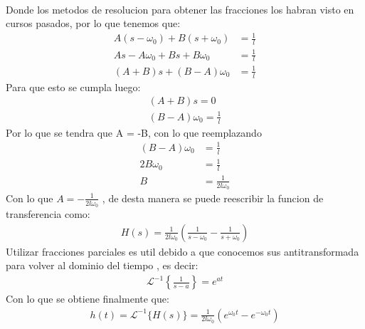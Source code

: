\documentclass[
  11pt,
  letterpaper,
   addpoints,
   answers
  ]{exam}
\begin{document}
\begin{questions}
\begin{solution}
\begin{align}
        \end{align}
        Donde los metodos de resolucion para obtener las fracciones los habran visto en cursos pasados, por lo que tenemos que:
        \begin{align}
            A(s-\omega_{0}) + B(s+\omega_{0}) &= \frac{1}{l}\\
            As - A\omega_{0} + Bs + B\omega_{0} &= \frac{1}{l}\\
            (A+B)s + (B-A)\omega_{0} &= \frac{1}{l}
        \end{align}
        Para que esto se cumpla luego:
        \begin{align}
            (A+B)s=0\\
            (B-A)\omega_{0} = \frac{1}{l}
        \end{align}
    Por lo que se tendra que A = -B, con lo que reemplazando
    \begin{align}
        (B-A)\omega_{0} &= \frac{1}{l}\\
        2B\omega_{0} &= \frac{1}{l}\\
        B &= \frac{1}{2l\omega_{0}}
    \end{align}
    Con lo que $A=-\frac{1}{2l\omega_{0}}$ , de desta manera se puede reescribir la funcion de transferencia como:
    \begin{align}
        H(s) = \frac{1}{2l\omega_{0}}\left(\frac{1}{s-\omega_{0}} - \frac{1}{s+\omega_{0}}\right)
    \end{align}
    Utilizar fracciones parciales es util debido a que conocemos sus antitransformada para volver al dominio del tiempo , es decir:
    \begin{align}
        \mathcal{L}^{-1}\left\{\frac{1}{s-a}\right\} = e^{at}
    \end{align}
    Con lo que se obtiene finalmente que:
    \begin{align}
        h(t) = \mathcal{L}^{-1}\{H(s)\} = \frac{1}{2l\omega_{0}}\left(e^{\omega_{0}t} - e^{-\omega_{0}t}\right)
    \end{align}

\end{solution}
\end{questions}
\end{document}
